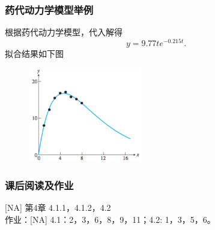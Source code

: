 \documentclass[10pt]{beamer}
\begin{document}
\begin{frame}
\frametitle{药代动力学模型举例}
根据药代动力学模型，代入解得
\begin{equation}
y = 9.77 t e^{-0.215t}.
\end{equation}
拟合结果如下图
\begin{figure}
\includegraphics[width=5cm]{figs/4-2-2_Drug_Concentration-3} 
\end{figure}
\end{frame}


\begin{frame}
\frametitle{课后阅读及作业}
[NA] 第4章 4.1.1，4.1.2，4.2 \\
作业：[NA] 4.1：2，3，6，8，9，11；4.2: 1，3，5，6。


\end{frame}
\end{document}
